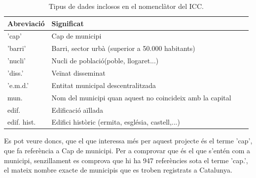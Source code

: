 \documentclass[12pt,a4paper,openright,oneside]{article}
\numberwithin{equation}{section}
\theoremstyle{definition}
\begin{document}
\begin{table}[htbp]
\begin{center}
	\centering
    \begin{tabular}{| l | l | l | l |}
    \hline
    \textbf{Abreviació} & \textbf{Significat} \\ \hline
    'cap' & Cap de municipi \\ \hline
	'barri' & Barri, sector urbà (superior a 50.000 habitants)\\ \hline
	'nucli' & Nucli de població(poble, llogaret...)\\ \hline
	'diss.' & Veïnat disseminat \\ \hline
	'e.m.d.' & Entitat municipal descentralitzada \\ \hline
	mun. & Nom del municipi quan aquest no coincideix amb la capital \\ \hline
	edif. & Edificació aïllada\\ \hline
	edif. hist. & Edifici històric (ermita, església, castell,...)\\ \hline
    \end{tabular}
\end{center}
\caption{Tipus de dades inclosos en el nomenclàtor del ICC.\cite{icc}}
\end{table}
Es pot veure doncs, que el que interessa més per aquest projecte és el terme 'cap', que fa referència a Cap de municipi. Per a comprovar que és el que s'entén com a municipi, senzillament es comprova que hi ha 947 referències sota el terme 'cap.', el mateix nombre exacte de municipis que es troben registrats a Catalunya.
\end{document}
